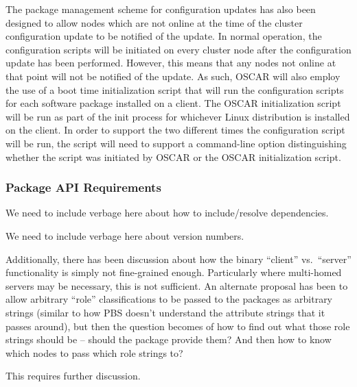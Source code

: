 The package management scheme for configuration updates has also been
designed to allow nodes which are not online at the time of the
cluster configuration update to be notified of the update. In normal
operation, the configuration scripts will be initiated on every
cluster node after the configuration update has been
performed. However, this means that any nodes not online at that point
will not be notified of the update. As such, OSCAR will also employ
the use of a boot time initialization script that will run the
configuration scripts for each software package installed on a
client. The OSCAR initialization script will be run as part of the
init process for whichever Linux distribution is installed on the
client. In order to support the two different times the configuration
script will be run, the script will need to support a command-line
option distinguishing whether the script was initiated by OSCAR or the
OSCAR initialization script.

\subsubsection{Package API Requirements}

\begin{discuss}
  We need to include verbage here about how to include/resolve
  dependencies.
\end{discuss}

\begin{discuss}
  We need to include verbage here about version numbers.
\end{discuss}

\begin{discuss}
  Additionally, there has been discussion about how the binary
  ``client'' vs.\ ``server'' functionality is simply not fine-grained
  enough.  Particularly where multi-homed servers may be necessary,
  this is not sufficient.  An alternate proposal has been to allow
  arbitrary ``role'' classifications to be passed to the packages as
  arbitrary strings (similar to how PBS doesn't understand the
  attribute strings that it passes around), but then the question
  becomes of how to find out what those role strings should be --
  should the package provide them?  And then how to know which nodes
  to pass which role strings to?

  This requires further discussion.
\end{discuss}

